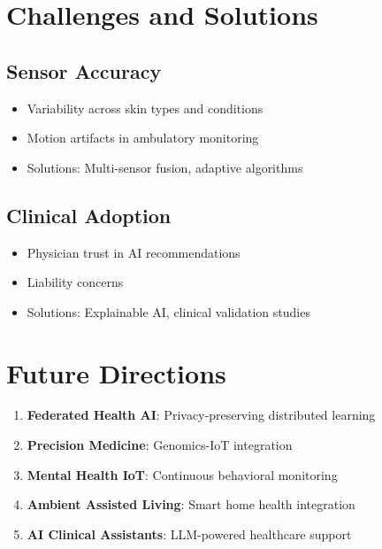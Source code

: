 \documentclass[12pt,a4paper]{article}
\begin{document}
\section{Challenges and Solutions}

\subsection{Sensor Accuracy}

\begin{itemize}
    \item Variability across skin types and conditions
    \item Motion artifacts in ambulatory monitoring
    \item Solutions: Multi-sensor fusion, adaptive algorithms
\end{itemize}

\subsection{Clinical Adoption}

\begin{itemize}
    \item Physician trust in AI recommendations
    \item Liability concerns
    \item Solutions: Explainable AI, clinical validation studies
\end{itemize}

\section{Future Directions}

\begin{enumerate}
    \item \textbf{Federated Health AI}: Privacy-preserving distributed learning
    \item \textbf{Precision Medicine}: Genomics-IoT integration
    \item \textbf{Mental Health IoT}: Continuous behavioral monitoring
    \item \textbf{Ambient Assisted Living}: Smart home health integration
    \item \textbf{AI Clinical Assistants}: LLM-powered healthcare support
\end{enumerate}
\end{document}
